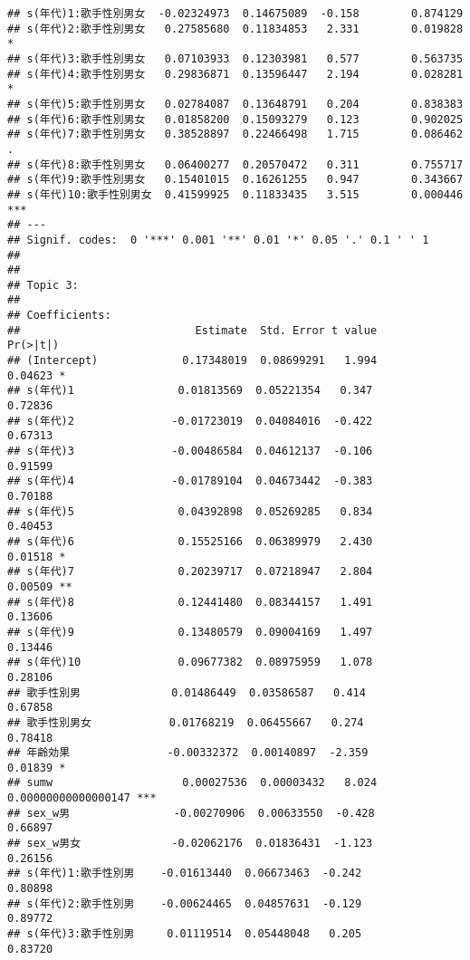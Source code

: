 \documentclass[
]{article}
\begin{document}
\begin{verbatim}
## s(年代)1:歌手性別男女  -0.02324973  0.14675089  -0.158        0.874129    
## s(年代)2:歌手性別男女   0.27585680  0.11834853   2.331        0.019828 *  
## s(年代)3:歌手性別男女   0.07103933  0.12303981   0.577        0.563735    
## s(年代)4:歌手性別男女   0.29836871  0.13596447   2.194        0.028281 *  
## s(年代)5:歌手性別男女   0.02784087  0.13648791   0.204        0.838383    
## s(年代)6:歌手性別男女   0.01858200  0.15093279   0.123        0.902025    
## s(年代)7:歌手性別男女   0.38528897  0.22466498   1.715        0.086462 .  
## s(年代)8:歌手性別男女   0.06400277  0.20570472   0.311        0.755717    
## s(年代)9:歌手性別男女   0.15401015  0.16261255   0.947        0.343667    
## s(年代)10:歌手性別男女  0.41599925  0.11833435   3.515        0.000446 ***
## ---
## Signif. codes:  0 '***' 0.001 '**' 0.01 '*' 0.05 '.' 0.1 ' ' 1
## 
## 
## Topic 3:
## 
## Coefficients:
##                           Estimate  Std. Error t value            Pr(>|t|)    
## (Intercept)             0.17348019  0.08699291   1.994             0.04623 *  
## s(年代)1                0.01813569  0.05221354   0.347             0.72836    
## s(年代)2               -0.01723019  0.04084016  -0.422             0.67313    
## s(年代)3               -0.00486584  0.04612137  -0.106             0.91599    
## s(年代)4               -0.01789104  0.04673442  -0.383             0.70188    
## s(年代)5                0.04392898  0.05269285   0.834             0.40453    
## s(年代)6                0.15525166  0.06389979   2.430             0.01518 *  
## s(年代)7                0.20239717  0.07218947   2.804             0.00509 ** 
## s(年代)8                0.12441480  0.08344157   1.491             0.13606    
## s(年代)9                0.13480579  0.09004169   1.497             0.13446    
## s(年代)10               0.09677382  0.08975959   1.078             0.28106    
## 歌手性別男              0.01486449  0.03586587   0.414             0.67858    
## 歌手性別男女            0.01768219  0.06455667   0.274             0.78418    
## 年齢効果               -0.00332372  0.00140897  -2.359             0.01839 *  
## sumw                    0.00027536  0.00003432   8.024 0.00000000000000147 ***
## sex_w男                -0.00270906  0.00633550  -0.428             0.66897    
## sex_w男女              -0.02062176  0.01836431  -1.123             0.26156    
## s(年代)1:歌手性別男    -0.01613440  0.06673463  -0.242             0.80898    
## s(年代)2:歌手性別男    -0.00624465  0.04857631  -0.129             0.89772    
## s(年代)3:歌手性別男     0.01119514  0.05448048   0.205             0.83720    

\end{verbatim}
\end{document}
